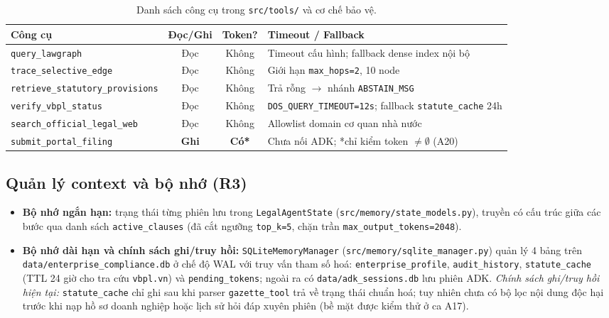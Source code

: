 \documentclass[sigconf,nonacm]{acmart}
\begin{document}
\begin{table}[t]
\caption{Danh sách công cụ trong \texttt{src/tools/} và cơ chế bảo vệ.}
\label{tab:tools}
\scriptsize
\begin{tabular}{@{}p{2.35cm}ccp{2.65cm}@{}}
\toprule
\textbf{Công cụ} & \textbf{Đọc/Ghi} & \textbf{Token?} & \textbf{Timeout / Fallback} \\
\midrule
\texttt{query\_lawgraph} & Đọc & Không & Timeout cấu hình; fallback dense index nội bộ \\
\texttt{trace\_selective\_edge} & Đọc & Không & Giới hạn \texttt{max\_hops=2}, 10 node \\
\texttt{retrieve\_statutory\_\allowbreak provisions} & Đọc & Không & Trả rỗng $\rightarrow$ nhánh \texttt{ABSTAIN\_MSG} \\
\texttt{verify\_vbpl\_status} & Đọc & Không & \texttt{DOS\_QUERY\_TIMEOUT=12s}; fallback \texttt{statute\_cache} 24h \\
\texttt{search\_official\_\allowbreak legal\_web} & Đọc & Không & Allowlist domain cơ quan nhà nước \\
\texttt{submit\_portal\_filing} & \textbf{Ghi} & \textbf{Có*} & Chưa nối ADK; *chỉ kiểm token $\neq \emptyset$ (A20) \\
\bottomrule
\end{tabular}
\end{table}

\subsection{Quản lý context và bộ nhớ (R3)}
\begin{itemize}[leftmargin=*]
  \item \textbf{Bộ nhớ ngắn hạn:} trạng thái từng phiên lưu trong \texttt{LegalAgentState} (\texttt{src/memory/state\_models.py}), truyền có cấu trúc giữa các bước qua danh sách \texttt{active\_clauses} (đã cắt ngưỡng \texttt{top\_k=5}, chặn trần \texttt{max\_output\_tokens=2048}).
  \item \textbf{Bộ nhớ dài hạn và chính sách ghi/truy hồi:} \texttt{SQLiteMemoryManager} (\texttt{src/memory/sqlite\_manager.py}) quản lý 4 bảng trên \texttt{data/enterprise\_compliance.db} ở chế độ WAL với truy vấn tham số hoá: \texttt{enterprise\_profile}, \texttt{audit\_history}, \texttt{statute\_cache} (TTL 24 giờ cho tra cứu \texttt{vbpl.vn}) và \texttt{pending\_tokens}; ngoài ra có \texttt{data/adk\_sessions.db} lưu phiên ADK. \emph{Chính sách ghi/truy hồi hiện tại:} \texttt{statute\_cache} chỉ ghi sau khi parser \texttt{gazette\_tool} trả về trạng thái chuẩn hoá; tuy nhiên chưa có bộ lọc nội dung độc hại trước khi nạp hồ sơ doanh nghiệp hoặc lịch sử hỏi đáp xuyên phiên (bề mặt được kiểm thử ở ca A17).
\end{itemize}
\end{document}
